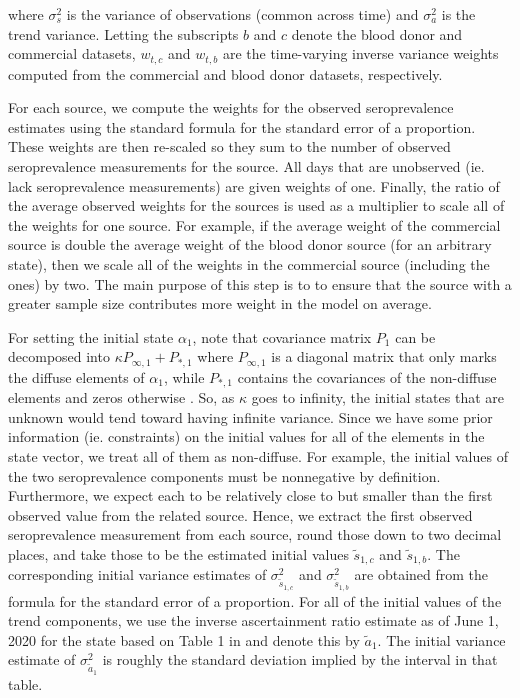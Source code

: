 \documentclass{article}
\begin{document}
where $\sigma^2_s$ is the variance of observations (common across time) and $\sigma^2_a$ is the trend variance. Letting the subscripts $b$ and $c$ denote the blood donor and commercial datasets, $w_{t,c}$ and $w_{t,b}$ are the time-varying inverse variance weights computed from the commercial and blood donor datasets, respectively. 

For each source, we compute the weights for the observed seroprevalence estimates using the standard formula for the standard error of a proportion. These weights are then re-scaled so they sum to the number of observed seroprevalence measurements for the source. All days that are unobserved (ie. lack seroprevalence measurements) are given weights of one. Finally, the ratio of the average observed weights for the sources is used as a multiplier to scale all of the weights for one source. For example, if the average weight of the commercial source is double the average weight of the blood donor source (for an arbitrary state), then we scale all of the weights in the commercial source (including the ones) by two. The main purpose of this step is to to ensure that the source with a greater sample size contributes more weight in the model on average. %

For setting the initial state $\alpha_1$, note that covariance matrix $P_1$ can be decomposed into $\kappa P_{\infty, 1} + P_{*, 1}$ where $P_{\infty, 1}$ is a diagonal matrix that only marks the diffuse elements of $\alpha_1$, while $P_{*, 1}$ contains the covariances of the non-diffuse elements and zeros otherwise \citep{koopman2003filtering}. So, as $\kappa$ goes to infinity, the initial states that are unknown would tend toward having infinite variance. Since we have some prior information (ie. constraints) on the initial values for all of the elements in the state vector, we treat all of them as non-diffuse. For example, the initial values of the two seroprevalence components must be nonnegative by definition. Furthermore, we expect each to be relatively close to but smaller than the first observed value from the related source. Hence, we extract the first observed seroprevalence measurement from each source, round those down to two decimal places, and take those to be the estimated initial values $\tilde{s}_{1,c}$ and
$\tilde{s}_{1,b}$. The corresponding initial variance estimates of $\sigma^2_{\tilde{s}_{1,c}}$ and $\sigma^2_{\tilde{s}_{1,b}}$ are obtained from the formula for the standard error of a proportion. For all of the initial values of the trend components, we use the inverse ascertainment ratio estimate as of June 1, 2020 for the state based on Table 1 in \citet{unwin2020state} and denote this by $\tilde{a}_1$. The initial variance estimate of $\sigma^2_{\tilde{a}_1}$ is roughly the standard deviation implied by the interval in that table.  
\end{document}
